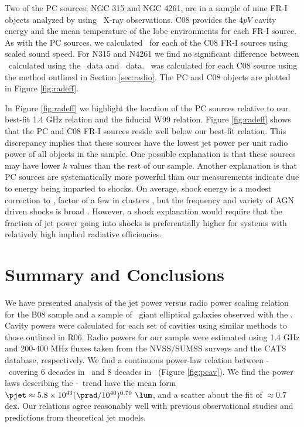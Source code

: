 \documentclass{emulateapj}
\begin{document}
Two of the PC sources, NGC 315 and NGC 4261, are in a sample of nine
FR-I objects analyzed by \citet[][hereafter C08]{2008MNRAS.386.1709C}
using \xmm\ X-ray observations. C08 provides the $4pV$ cavity energy
and the mean temperature of the lobe environments for each FR-I
source. As with the PC sources, we calculated \pcav\ for each of the
C08 FR-I sources using scaled sound speed. For N315 and N4261 we find
no significant difference between \pcav\ calculated using the
\chandra\ data and \xmm\ data. \phigh\ was calculated for each C08
source using the method outlined in Section \ref{sec:radio}. The PC
and C08 objects are plotted in Figure \ref{fig:radeff}.

In Figure \ref{fig:radeff} we highlight the location of the PC sources
relative to our best-fit 1.4 GHz relation and the fiducial W99
relation. Figure \ref{fig:radeff} shows that the PC and C08 FR-I
sources reside well below our best-fit relation. This discrepancy
implies that these sources have the lowest jet power per unit radio
power of all objects in the sample. One possible explanation is that
these sources may have lower $k$ values than the rest of our
sample. Another explanation is that PC sources are systematically more
powerful than our measurements indicate due to energy being imparted
to shocks. On average, shock energy is a modest correction to \pcav,
factor of a few in clusters \citep{mcnamrev}, but the frequency and
variety of AGN driven shocks is broad
\citep[\eg][]{2003ApJ...592..129K, hydraa, herca,
  2003ApJ...592..129K}. However, a shock explanation would require
that the fraction of jet power going into shocks is preferentially
higher for systems with relatively high implied radiative
efficiencies.

\section{Summary and Conclusions}
\label{sec:summary}

We have presented analysis of the jet power versus radio power scaling
relation for the B08 sample and a sample of \samp\ giant elliptical
galaxies observed with the \cxo. Cavity powers were calculated for
each set of cavities using similar methods to those outlined in
R06. Radio powers for our sample were estimated using 1.4 GHz and
200-400 MHz fluxes taken from the NVSS/SUMSS surveys and the CATS
database, respectively. We find a continuous power-law relation
between \pjet-\prad\ covering 6 decades in \prad\ and 8 decades in
\pjet\ (Figure \ref{fig:pcav}). We find the power laws describing the
\pjet-\prad\ trend have the mean form $\pjet \approx 5.8 \times
10^{43} (\prad/10^{40})^{0.70} ~\lum$, and a scatter about the fit of
$\approx 0.7$ dex. Our relations agree reasonably well with previous
observational studies and predictions from theoretical jet models.
\end{document}
